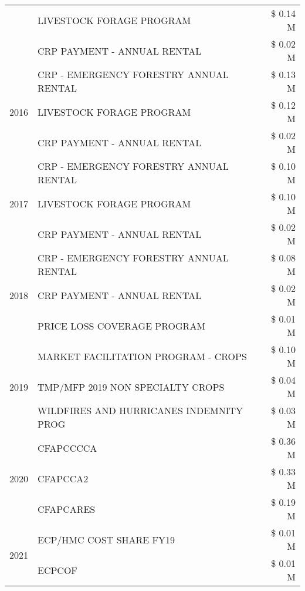 \begin{tabular}{llr}
 & LIVESTOCK FORAGE PROGRAM & \$ 0.14 M \\
 & CRP PAYMENT - ANNUAL RENTAL & \$ 0.02 M \\
\cline{1-3}
\multirow[t]{3}{*}{2016} & CRP - EMERGENCY FORESTRY ANNUAL RENTAL & \$ 0.13 M \\
 & LIVESTOCK FORAGE PROGRAM & \$ 0.12 M \\
 & CRP PAYMENT - ANNUAL RENTAL & \$ 0.02 M \\
\cline{1-3}
\multirow[t]{3}{*}{2017} & CRP - EMERGENCY FORESTRY ANNUAL RENTAL & \$ 0.10 M \\
 & LIVESTOCK FORAGE PROGRAM & \$ 0.10 M \\
 & CRP PAYMENT - ANNUAL RENTAL & \$ 0.02 M \\
\cline{1-3}
\multirow[t]{3}{*}{2018} & CRP - EMERGENCY FORESTRY ANNUAL RENTAL & \$ 0.08 M \\
 & CRP PAYMENT - ANNUAL RENTAL & \$ 0.02 M \\
 & PRICE LOSS COVERAGE PROGRAM & \$ 0.01 M \\
\cline{1-3}
\multirow[t]{3}{*}{2019} & MARKET FACILITATION PROGRAM - CROPS & \$ 0.10 M \\
 & TMP/MFP 2019 NON SPECIALTY CROPS & \$ 0.04 M \\
 & WILDFIRES AND HURRICANES INDEMNITY PROG & \$ 0.03 M \\
\cline{1-3}
\multirow[t]{3}{*}{2020} & CFAPCCCCA & \$ 0.36 M \\
 & CFAPCCA2 & \$ 0.33 M \\
 & CFAPCARES & \$ 0.19 M \\
\cline{1-3}
\multirow[t]{2}{*}{2021} & ECP/HMC COST SHARE FY19 & \$ 0.01 M \\
 & ECPCOF & \$ 0.01 M \\
\cline{1-3}
\bottomrule
\end{tabular}
